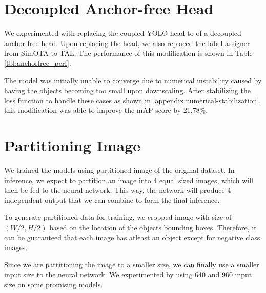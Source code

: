
\section{Decoupled Anchor-free Head}
We experimented with replacing the coupled YOLO head to of a decoupled anchor-free head.
Upon replacing the head, we also replaced the label assigner from SimOTA to TAL.
The performance of this modification is shown in Table \ref{tbl:anchorfree_perf}.

The model was initially unable to converge due to numerical instability caused by having the objects becoming too small upon downscaling.
After stabilizing the loss function to handle these cases as shown in \ref{appendix:numerical-stabilization}, 
this modification was able to improve the mAP score by 21.78\%.

\begin{table}
  \centering
  \label{tbl:anchorfree_perf}
  \vspace{-1ex}
  
\end{table}


\section{Partitioning Image}
We trained the models using partitioned image of the original dataset.
In inference, we expect to partition an image into 4 equal sized images, which will
then be fed to the neural network. This way, the network will produce 4 independent
output that we can combine to form the final inference.

To generate partitioned data for training, we cropped image with size of $(W/2,H/2)$
based on the location of the objects bounding boxes. Therefore, it can be guaranteed that each image has atleast
an object except for negative class images.

Since we are partitioning the image to a smaller size, we can finally use a smaller input size 
to the neural network. We experimented by using 640 and 960 input size on some promising models.

